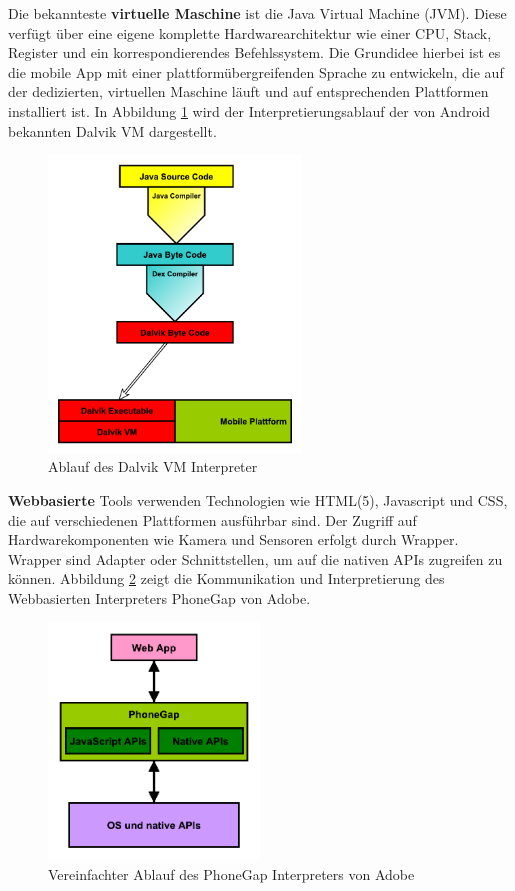 Die bekannteste \textbf{virtuelle Maschine} ist die Java Virtual Machine (JVM). Diese verfügt über eine eigene komplette Hardwarearchitektur wie einer CPU, Stack, Register und ein korrespondierendes Befehlssystem. Die Grundidee hierbei ist es die mobile App mit einer plattformübergreifenden Sprache zu entwickeln, die auf der dedizierten, virtuellen Maschine läuft und auf entsprechenden Plattformen installiert ist. In Abbildung \ref{graph_interpreter_Dalvik} wird der Interpretierungsablauf der von Android bekannten Dalvik VM dargestellt.

\begin{figure}[htbp]
	\centering
	\includegraphics[width=0.6\textwidth]{Bilder/Interpretation_VM_Dalvik}
	\caption{Ablauf des Dalvik VM Interpreter}\label{graph_interpreter_Dalvik}
\end{figure}

\bigskip
\textbf{Webbasierte} Tools verwenden Technologien wie HTML(5), Javascript und CSS, die auf verschiedenen Plattformen ausführbar sind. Der Zugriff auf Hardwarekomponenten wie Kamera und Sensoren erfolgt durch Wrapper. Wrapper sind Adapter oder Schnittstellen, um auf die nativen APIs zugreifen zu können. Abbildung \ref{graph_interpreter_PhoneGap} zeigt die Kommunikation und Interpretierung des Webbasierten Interpreters PhoneGap von Adobe.

\begin{figure}[htbp]
	\centering
	\includegraphics[width=0.5\textwidth]{Bilder/Interpretation_Web_PhoneGap}
	\caption{Vereinfachter Ablauf des PhoneGap Interpreters von Adobe}\label{graph_interpreter_PhoneGap}
\end{figure} 

